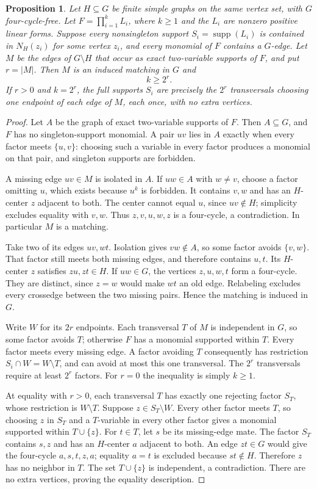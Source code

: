 \documentclass[11pt]{article}
\newcommand{\supp}{\operatorname{supp}}
\newtheorem{proposition}[theorem]{Proposition}
\theoremstyle{definition}
\theoremstyle{remark}
\begin{document}
\begin{proposition}\label{prop:oldfactors}
Let $H\subseteq G$ be finite simple graphs on the same vertex set, with $G$ four-cycle-free. Let $F=\prod_{i=1}^k L_i$, where $k\ge1$ and the $L_i$ are nonzero positive linear forms. Suppose every nonsingleton support $S_i=\supp(L_i)$ is contained in $N_H(z_i)$ for some vertex $z_i$, and every monomial of $F$ contains a $G$-edge. Let $M$ be the edges of $G\setminus H$ that occur as exact two-variable supports of $F$, and put $r=|M|$. Then $M$ is an induced matching in $G$ and
\[
 k\ge2^r.
\]
If $r>0$ and $k=2^r$, the full supports $S_i$ are precisely the $2^r$ transversals choosing one endpoint of each edge of $M$, each once, with no extra vertices.
\end{proposition}
\begin{proof}
Let $A$ be the graph of exact two-variable supports of $F$. Then $A\subseteq G$, and $F$ has no singleton-support monomial. A pair $uv$ lies in $A$ exactly when every factor meets $\{u,v\}$: choosing such a variable in every factor produces a monomial on that pair, and singleton supports are forbidden.

A missing edge $uv\in M$ is isolated in $A$. If $uw\in A$ with $w\ne v$, choose a factor omitting $u$, which exists because $u^k$ is forbidden. It contains $v,w$ and has an $H$-center $z$ adjacent to both. The center cannot equal $u$, since $uv\notin H$; simplicity excludes equality with $v,w$. Thus $z,v,u,w,z$ is a four-cycle, a contradiction. In particular $M$ is a matching.

Take two of its edges $uv,wt$. Isolation gives $vw\notin A$, so some factor avoids $\{v,w\}$. That factor still meets both missing edges, and therefore contains $u,t$. Its $H$-center $z$ satisfies $zu,zt\in H$. If $uw\in G$, the vertices $z,u,w,t$ form a four-cycle. They are distinct, since $z=w$ would make $wt$ an old edge. Relabeling excludes every crossedge between the two missing pairs. Hence the matching is induced in $G$.

Write $W$ for its $2r$ endpoints. Each transversal $T$ of $M$ is independent in $G$, so some factor avoids $T$; otherwise $F$ has a monomial supported within $T$. Every factor meets every missing edge. A factor avoiding $T$ consequently has restriction $S_i\cap W=W\setminus T$, and can avoid at most this one transversal. The $2^r$ transversals require at least $2^r$ factors. For $r=0$ the inequality is simply $k\ge1$.

At equality with $r>0$, each transversal $T$ has exactly one rejecting factor $S_T$, whose restriction is $W\setminus T$. Suppose $z\in S_T\setminus W$. Every other factor meets $T$, so choosing $z$ in $S_T$ and a $T$-variable in every other factor gives a monomial supported within $T\cup\{z\}$. For $t\in T$, let $s$ be its missing-edge mate. The factor $S_T$ contains $s,z$ and has an $H$-center $a$ adjacent to both. An edge $zt\in G$ would give the four-cycle $a,s,t,z,a$; equality $a=t$ is excluded because $st\notin H$. Therefore $z$ has no neighbor in $T$. The set $T\cup\{z\}$ is independent, a contradiction. There are no extra vertices, proving the equality description.
\end{proof}
\end{document}
